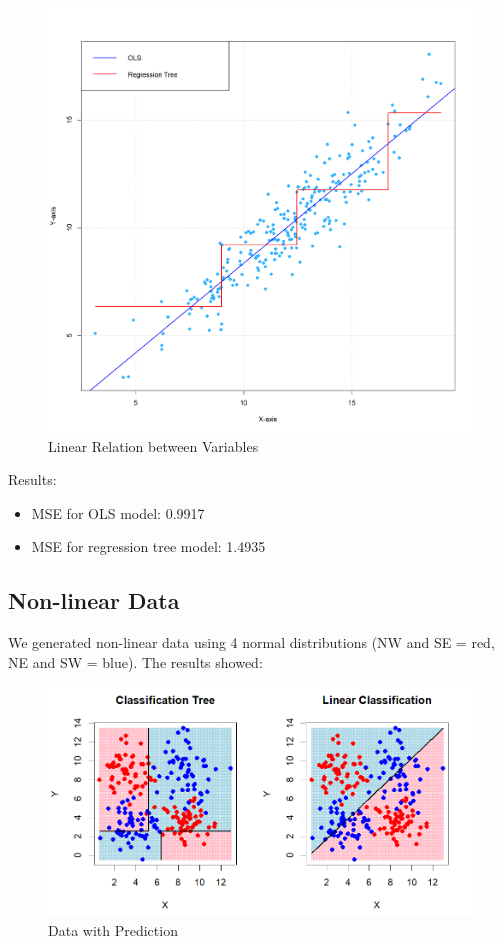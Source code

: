 \documentclass[12pt]{article}
\begin{document}
\begin{figure}
    \centering
    \includegraphics[width=1\linewidth]{OLS vs Tree.png}
    \caption{Linear Relation between Variables}
    \label{fig:sub4}  %
\end{figure}


Results:
\begin{itemize}
    \item MSE for OLS model: 0.9917 
    \item MSE for regression tree model: 1.4935 
\end{itemize}


\subsection{Non-linear Data}
We generated non-linear data using 4 normal distributions (NW and SE = red, NE and SW = blue). The results showed:


\begin{figure}
    \centering
    \includegraphics[scale=0.6]{NLD Pred.png}
    \caption{Data with Prediction}
    \label{fig:sub6}  %
\end{figure}
\end{document}
